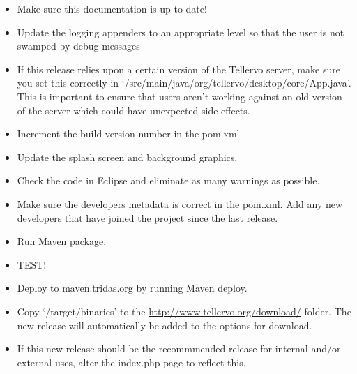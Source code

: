 \begin{itemize}
 \item Make sure this documentation is up-to-date!  
 \item Update the logging appenders to an appropriate level so that the user is not swamped by debug messages
 \item If this release relies upon a certain version of the Tellervo server, make sure you set this correctly in `/src/main/java/org/tellervo/desktop/core/App.java'.  This is important to ensure that users aren't working against an old version of the server which could have unexpected side-effects.
 \item Increment the build version number in the pom.xml
 \item Update the splash screen and background graphics.
 \item Check the code in Eclipse and eliminate as many warnings as possible.
 \item Make sure the developers metadata is correct in the pom.xml.  Add any new developers that have joined the project since the last release.
 \item Run Maven package.
 \item TEST!
 \item Deploy to maven.tridas.org by running Maven deploy.
 \item Copy `/target/binaries' to the \url{http://www.tellervo.org/download/} folder.  The new release will automatically be added to the options for download.
 \item If this new release should be the recommmended release for internal and/or external uses, alter the index.php page to reflect this.
\end{itemize}


